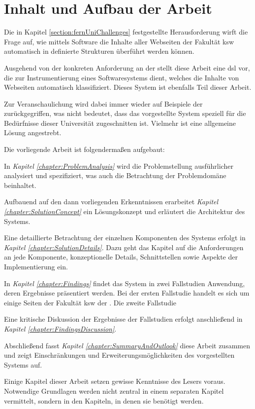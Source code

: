    \section{Inhalt und Aufbau der Arbeit}
        Die in Kapitel \ref{section:fernUniChallenges} festgestellte Herausforderung
        wirft die Frage auf, wie mittels Software die Inhalte aller Webseiten der Fakultät \gls{ksw}
        automatisch in definierte Strukturen überführt werden können.
        
        Ausgehend von der konkreten Anforderung an der {\fernUni} stellt diese Arbeit eine
        \gls{dsl} vor, die zur Instrumentierung eines Softwaresystems dient,
        welches die Inhalte von Webseiten automatisch klassifiziert.
        Dieses System ist ebenfalls Teil dieser Arbeit.

        Zur Veranschaulichung wird dabei immer wieder auf Beispiele der {\fernUni}
        zurückgegriffen, was nicht bedeutet, dass das vorgestellte System
        speziell für die Bedürfnisse dieser Universität zugeschnitten ist.
        Vielmehr ist eine allgemeine Lösung angestrebt.

        Die vorliegende Arbeit ist folgendermaßen aufgebaut:

        In \textit{Kapitel \ref{chapter:ProblemAnalysis}} wird die Problemstellung ausführlicher
        analysiert und spezifiziert, was auch die Betrachtung der Problemdomäne beinhaltet.

        Aufbauend auf den dann vorliegenden Erkenntnissen erarbeitet
        \textit{Kapitel \ref{chapter:SolutionConcept}}
        ein Lösungskonzept und erläutert die Architektur des Systems.

        Eine detaillierte Betrachtung der einzelnen Komponenten des Systems
        erfolgt in \textit{Kapitel \ref{chapter:SolutionDetails}}.
        Dazu geht das Kapitel auf die Anforderungen an jede Komponente,
        konzeptionelle Details, Schnittstellen sowie Aspekte der Implementierung ein.
        
        In \textit{Kapitel \ref{chapter:Findings}} findet das System in zwei Fallstudien
        Anwendung, deren Ergebnisse präsentiert werden.
        Bei der ersten Fallstudie handelt es sich um einige Seiten der Fakultät \gls{ksw}
        der \fernUni.
        Die zweite Fallstudie %

        Eine kritische Diskussion der Ergebnisse der Fallstudien erfolgt anschließend in
        \textit{Kapitel \ref{chapter:FindingsDiscussion}}.

        Abschließend fasst \textit{Kapitel \ref{chapter:SummaryAndOutlook}}
        diese Arbeit zusammen und zeigt Einschränkungen und Erweiterungsmöglichkeiten
        des vorgestellten Systems auf.

        Einige Kapitel dieser Arbeit setzen gewisse Kenntnisse des Lesers voraus.
        Notwendige Grundlagen werden nicht zentral in einem separaten Kapitel vermittelt,
        sondern in den Kapiteln, in denen sie benötigt werden.